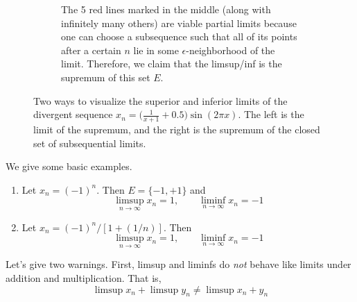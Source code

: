 \begin{definition}
\begin{figure}[H]
\begin{subfigure}[b]{0.48\textwidth}
        \caption{The 5 red lines marked in the middle (along with infinitely many others) are viable partial limits because one can choose a subsequence such that all of its points after a certain $n$ lie in some $\epsilon$-neighborhood of the limit. Therefore, we claim that the limsup/inf is the supremum of this set $E$.}
        \label{fig:limsupinf2}
      \end{subfigure}
      \caption{Two ways to visualize the superior and inferior limits of the divergent sequence $x_n = \big(\frac{1}{x+1} + 0.5\big) \sin(2\pi x)$. The left is the limit of the supremum, and the right is the supremum of the closed set of subsequential limits.} 
      \label{fig:limsupinf}
    \end{figure}
  \end{definition}

  \begin{example}
    We give some basic examples. 
    \begin{enumerate}
      \item Let $x_n = (-1)^n$. Then $E = \{-1, +1\}$ and 
      \begin{equation}
        \limsup_{n \rightarrow \infty} x_n = 1, \qquad \liminf_{n \rightarrow \infty} x_n = -1 
      \end{equation}

      \item Let $x_n = (-1)^n / [1 + (1/n)]$. Then 
      \begin{equation}
        \limsup_{n \rightarrow \infty} x_n = 1, \qquad \liminf_{n \rightarrow \infty} x_n = -1
      \end{equation}
    \end{enumerate}
  \end{example}

  Let's give two warnings. First, limsup and liminfs do \textit{not} behave like limits under addition and multiplication. That is, 
  \begin{equation}
    \limsup x_n + \limsup y_n \neq \limsup x_n + y_n 
  \end{equation}

